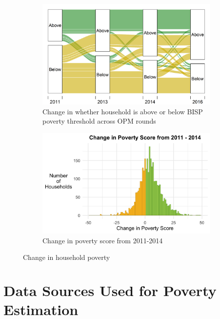 \documentclass[8pt, oneside]{article}
\begin{document}
\begin{figure}[ht]
\begin{subfigure}{.45\textwidth}
  \centering
  \includegraphics[width=1\textwidth]{Figures/bisp_poverty_alluvial.png}   
  \caption{Change in whether household is above or below BISP poverty threshold across OPM rounds}
  \label{fig:sub-first}
\end{subfigure}
\begin{subfigure}{.55\textwidth}
  \centering
  \includegraphics[trim=0 0 0 50mm,clip,width=1\textwidth]{Figures/pscore_changes_r13.png}   
  \caption{Change in poverty score from 2011-2014}
  \label{fig:sub-second}
\end{subfigure}
 \caption{Change in household poverty}     
\label{fig:pscore_change_hist}
\end{figure}




\newpage
\section{Data Sources Used for Poverty Estimation}
\end{document}
